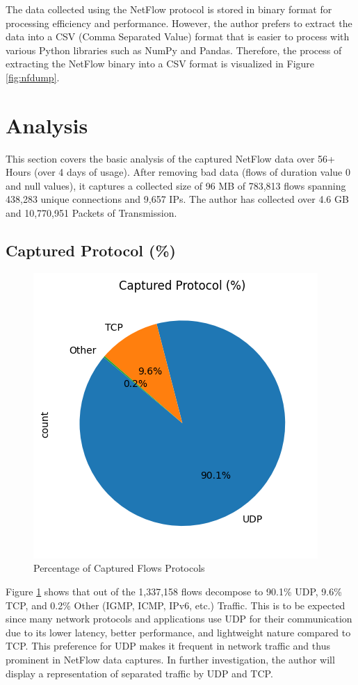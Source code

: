 \documentclass{article}
\begin{document}
The data collected using the NetFlow protocol is stored in binary format for processing efficiency and performance. However, the author prefers to extract the data into a CSV (Comma Separated Value) format that is easier to process with various Python libraries such as NumPy and Pandas. Therefore, the process of extracting the NetFlow binary into a CSV format is visualized in Figure \ref{fig:nfdump}.

\section{Analysis}

This section covers the basic analysis of the captured NetFlow data over 56+ Hours (over 4 days of usage). After removing bad data (flows of duration value 0 and null values), it captures a collected size of 96 MB of 783,813 flows spanning 438,283 unique connections and 9,657 IPs. The author has collected over 4.6 GB and 10,770,951 Packets of Transmission.

\subsection{Captured Protocol (\%)}

\begin{figure}[htbp]
    \centering
    \includegraphics[width=0.4\linewidth]{img/capp.png}
    \caption{Percentage of Captured Flows Protocols}
    \label{fig:nfanalcap}
\end{figure}

Figure \ref{fig:nfanalcap} shows that out of the 1,337,158 flows decompose to 90.1\% UDP, 9.6\% TCP, and 0.2\% Other (IGMP, ICMP, IPv6, etc.) Traffic. This is to be expected since many network protocols and applications use UDP for their communication due to its lower latency, better performance, and lightweight nature compared to TCP. This preference for UDP makes it frequent in network traffic and thus prominent in NetFlow data captures. In further investigation, the author will display a representation of separated traffic by UDP and TCP.
\end{document}
